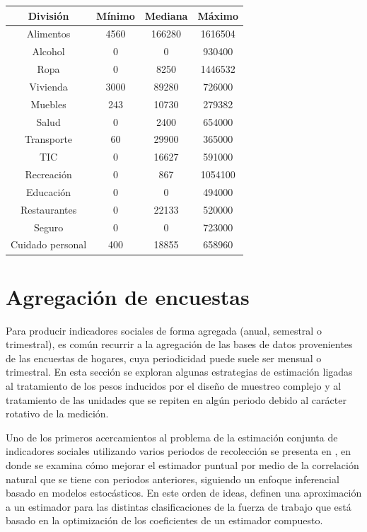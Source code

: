 \documentclass[
  12pt,
]{book}
\begin{document}
\begin{longtable}[]{@{}cccc@{}}
\toprule()
División & Mínimo & Mediana & Máximo \\
\midrule()
\endhead
Alimentos & 4560 & 166280 & 1616504 \\
Alcohol & 0 & 0 & 930400 \\
Ropa & 0 & 8250 & 1446532 \\
Vivienda & 3000 & 89280 & 726000 \\
Muebles & 243 & 10730 & 279382 \\
Salud & 0 & 2400 & 654000 \\
Transporte & 60 & 29900 & 365000 \\
TIC & 0 & 16627 & 591000 \\
Recreación & 0 & 867 & 1054100 \\
Educación & 0 & 0 & 494000 \\
Restaurantes & 0 & 22133 & 520000 \\
Seguro & 0 & 0 & 723000 \\
Cuidado personal & 400 & 18855 & 658960 \\
\bottomrule()
\end{longtable}

\hypertarget{agregaciuxf3n-de-encuestas}{%
\chapter{Agregación de encuestas}\label{agregaciuxf3n-de-encuestas}}

Para producir indicadores sociales de forma agregada (anual, semestral o
trimestral), es común recurrir a la agregación de las bases de datos
provenientes de las encuestas de hogares, cuya periodicidad puede suele
ser mensual o trimestral. En esta sección se exploran algunas
estrategias de estimación ligadas al tratamiento de los pesos inducidos
por el diseño de muestreo complejo y al tratamiento de las unidades que
se repiten en algún periodo debido al carácter rotativo de la medición.

Uno de los primeros acercamientos al problema de la estimación conjunta
de indicadores sociales utilizando varios periodos de recolección se
presenta en \citet{Gurney_Daly_1965}, en donde se examina cómo mejorar el
estimador puntual por medio de la correlación natural que se tiene con
periodos anteriores, siguiendo un enfoque inferencial basado en modelos
estocásticos. En este orden de ideas, \citet{Lent_Miller_Duff_1999} definen una
aproximación a un estimador para las distintas clasificaciones de la
fuerza de trabajo que está basado en la optimización de los coeficientes
de un estimador compuesto.
\end{document}
